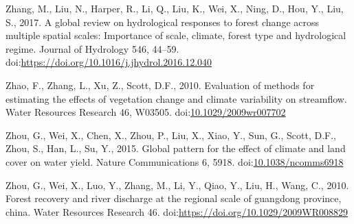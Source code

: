 \documentclass[]{elsarticle} %
\begin{document}
\leavevmode\hypertarget{ref-zhang2017}{}%
Zhang, M., Liu, N., Harper, R., Li, Q., Liu, K., Wei, X., Ning, D., Hou,
Y., Liu, S., 2017. A global review on hydrological responses to forest
change across multiple spatial scales: Importance of scale, climate,
forest type and hydrological regime. Journal of Hydrology 546, 44--59.
doi:\href{https://doi.org/https://doi.org/10.1016/j.jhydrol.2016.12.040}{https://doi.org/10.1016/j.jhydrol.2016.12.040}

\leavevmode\hypertarget{ref-zhao2010}{}%
Zhao, F., Zhang, L., Xu, Z., Scott, D.F., 2010. Evaluation of methods
for estimating the effects of vegetation change and climate variability
on streamflow. Water Resources Research 46, W03505.
doi:\href{https://doi.org/10.1029/2009wr007702}{10.1029/2009wr007702}

\leavevmode\hypertarget{ref-zhou2015}{}%
Zhou, G., Wei, X., Chen, X., Zhou, P., Liu, X., Xiao, Y., Sun, G.,
Scott, D.F., Zhou, S., Han, L., Su, Y., 2015. Global pattern for the
effect of climate and land cover on water yield. Nature Communications
6, 5918.
doi:\href{https://doi.org/10.1038/ncomms6918}{10.1038/ncomms6918}

\leavevmode\hypertarget{ref-zhou2010}{}%
Zhou, G., Wei, X., Luo, Y., Zhang, M., Li, Y., Qiao, Y., Liu, H., Wang,
C., 2010. Forest recovery and river discharge at the regional scale of
guangdong province, china. Water Resources Research 46.
doi:\href{https://doi.org/https://doi.org/10.1029/2009WR008829}{https://doi.org/10.1029/2009WR008829}
\end{document}
